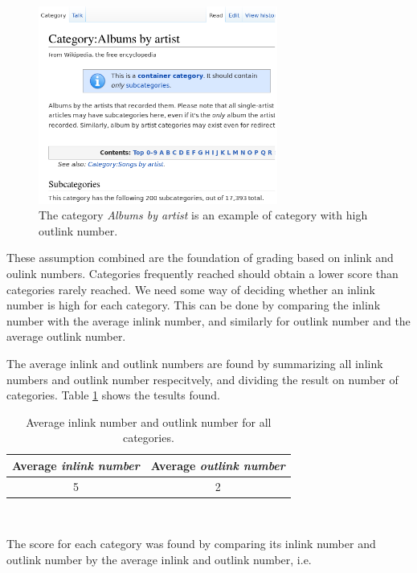 \begin{figure}[h]
\centering
\includegraphics[width=0.7\textwidth]{Chapters/Implementation/Grading/high_outlink_number}
\caption[Example of category with high \emph{outlink number}]{The category \emph{Albums by artist} is an example of category with high outlink number. }
\label{fig:high_outlink_number}
\end{figure}


These assumption combined are the foundation of grading based on inlink and oulink numbers. Categories frequently reached should obtain a lower score than categories rarely reached. We need some way of deciding whether an inlink number is high for each category. This can be done by comparing the inlink number with the average inlink number, and similarly for outlink number and the average outlink number. 


The average inlink and outlink numbers are found by summarizing all inlink numbers and outlink number respecitvely, and dividing the result on number of categories. Table \ref{tab:avginlinkoutlink} shows the tesults found. 



\begin{table}[ht]
\centering
\renewcommand{\arraystretch}{1.25}
\begin{tabularx}{\textwidth}{c |c}
\textbf{Average \emph{inlink number}} & \textbf{Average \emph{outlink number}}\\ \hline
 5 & 2 \\
\end{tabularx}
\\[10pt]
\caption{Average inlink number and outlink number for all categories.}
\label{tab:avginlinkoutlink}
\end{table}
The score for each category was found by comparing its inlink number and outlink number by the average inlink and outlink number, i.e. 

